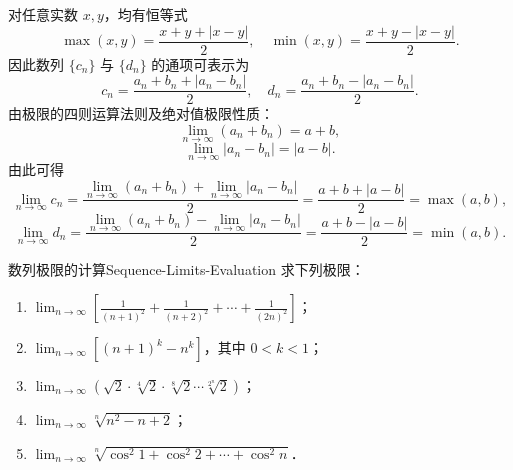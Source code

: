 \begin{myproof}
    对任意实数 $x, y$，均有恒等式
    \begin{equation}
        \max(x, y) = \frac{x + y + |x - y|}{2}, \quad \min(x, y) = \frac{x + y - |x - y|}{2}.
    \end{equation}
    因此数列 $\{c_n\}$ 与 $\{d_n\}$ 的通项可表示为
    \begin{equation}
        c_n = \frac{a_n + b_n + |a_n - b_n|}{2}, \quad d_n = \frac{a_n + b_n - |a_n - b_n|}{2}.
    \end{equation}
    由极限的四则运算法则及绝对值极限性质：
    \begin{equation}
        \lim_{n\to\infty} (a_n + b_n) = a + b,
    \end{equation}
    \begin{equation}
        \lim_{n\to\infty} |a_n - b_n| = |a - b|.
    \end{equation}
    由此可得
    \begin{equation}
        \lim_{n\to\infty} c_n = \frac{\lim_{n\to\infty}(a_n + b_n) + \lim_{n\to\infty}|a_n - b_n|}{2} = \frac{a + b + |a - b|}{2} = \max(a, b),
    \end{equation}
    \begin{equation}
        \lim_{n\to\infty} d_n = \frac{\lim_{n\to\infty}(a_n + b_n) - \lim_{n\to\infty}|a_n - b_n|}{2} = \frac{a + b - |a - b|}{2} = \min(a, b).
    \end{equation}
\end{myproof}

\begin{problem}{数列极限的计算}{Sequence-Limits-Evaluation}
    求下列极限：
    \begin{enumerate}
        \item $\lim_{n\to\infty} \left[ \frac{1}{(n+1)^2} + \frac{1}{(n+2)^2} + \cdots + \frac{1}{(2n)^2} \right]$；
        \item $\lim_{n\to\infty} \left[ (n+1)^k - n^k \right]$，其中 $0 < k < 1$；
        \item $\lim_{n\to\infty} \left( \sqrt{2} \cdot \sqrt[4]{2} \cdot \sqrt[8]{2} \cdots \sqrt[2^n]{2} \right)$；
        \item $\lim_{n\to\infty} \sqrt[n]{n^2 - n + 2}$；
        \item $\lim_{n\to\infty} \sqrt[n]{\cos^2 1 + \cos^2 2 + \cdots + \cos^2 n}$．
    \end{enumerate}
\end{problem}

